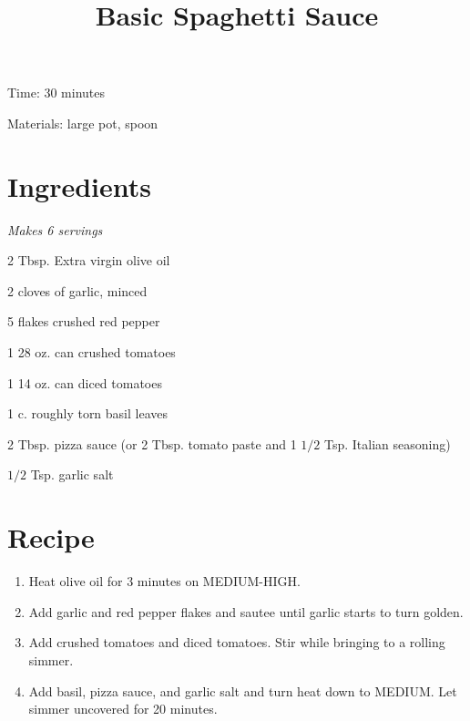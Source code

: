 \documentclass{article}
\title{Basic Spaghetti Sauce}
\begin{document}
Time: 30 minutes

Materials: large pot, spoon

\section{Ingredients}
\textit{Makes 6 servings}

2 Tbsp. Extra virgin olive oil

2 cloves of garlic, minced

5 flakes crushed red pepper

1 28 oz. can crushed tomatoes

1 14 oz. can diced tomatoes 

1 c. roughly torn basil leaves

2 Tbsp. pizza sauce (or 2 Tbsp. tomato paste and 1 $1/2$ Tsp. Italian seasoning)

$1/2$ Tsp. garlic salt

\section{Recipe}
\begin{enumerate}
\item{Heat olive oil for 3 minutes on MEDIUM-HIGH.}
\item{Add garlic and red pepper flakes and sautee until garlic starts to turn golden.}
\item{Add crushed tomatoes and diced tomatoes. Stir while bringing to a rolling simmer.}
\item{Add basil, pizza sauce, and garlic salt and turn heat down to MEDIUM. Let simmer uncovered for 20 minutes.}
\end{enumerate}
\end{document}
